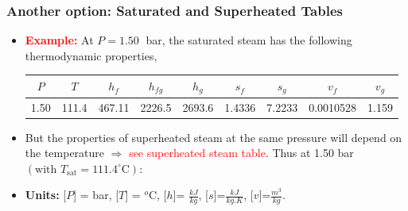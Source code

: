 \documentclass[10pt,compress]{beamer}
\begin{document}
\begin{frame}
  \frametitle{Another option: Saturated and Superheated Tables}
\noindent
\begin{itemize}
\item <1-> {\bf \textcolor{red}{Example:}} At $P=1.50\;$ bar, the saturated steam has the following thermodynamic properties,
\tiny 
\begin{center}
\begin{tabular}{c c|c c c|c c|c c} 
$P$ & $T$ & $h_{f}$ &  $h_{fg}$ & $h_{g}$ & $s_{f}$ &  $s_{g}$ & $v_{f}$ & $v_{g}$ \\ 
\hline
1.50 & 111.4 & 467.11 & 2226.5 & 2693.6 & 1.4336 & 7.2233 & 0.0010528 & 1.159 \\
\end{tabular}
\end{center}

\item <3-> But the properties of superheated steam at the same pressure will depend on the temperature $\Rightarrow$ \textcolor{red}{see superheated steam table}. Thus at 1.50 bar $\left(\text{with }T_{\text{sat}}=111.4^{\circ}\text{C}\right)$:
\item <2-> {\bf Units:} [$P$] = bar, [$T$] = $^{o}$C, [$h$]= $\frac{kJ}{kg}$, [$s$]=$\frac{kJ}{kg.K}$, [$v$]=$\frac{m^{3}}{kg}$.

\end{itemize}

\end{frame}
\end{document}
